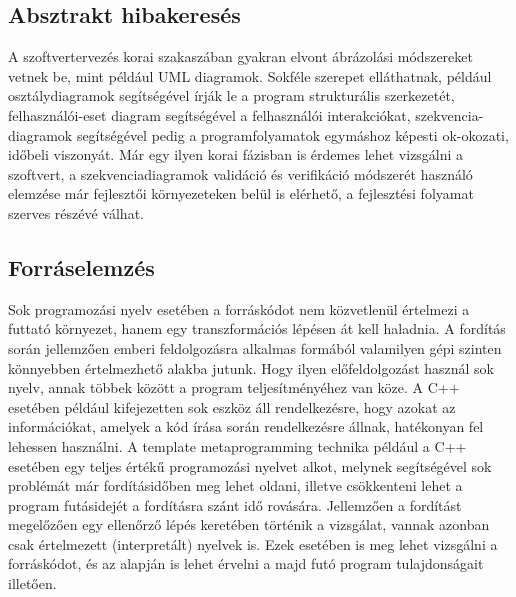 \documentclass[a4paper,12pt]{report}
\begin{document}
\subsection{Absztrakt hibakeresés}
A szoftvertervezés korai szakaszában gyakran elvont ábrázolási módszereket vetnek be, mint például UML diagramok. Sokféle szerepet elláthatnak, például osztálydiagramok segítségével írják le a program strukturális szerkezetét, felhasználói-eset diagram segítségével a felhasználói interakciókat, szekvencia-diagramok segítségével pedig a programfolyamatok egymáshoz képesti ok-okozati, időbeli viszonyát. Már egy ilyen korai fázisban is érdemes lehet vizsgálni a szoftvert, a szekvenciadiagramok validáció és verifikáció módszerét használó elemzése  \cite{umlverification} már fejlesztői környezeteken belül is elérhető, a fejlesztési folyamat szerves részévé válhat.

\subsection{Forráselemzés}
Sok programozási nyelv esetében a forráskódot nem közvetlenül értelmezi a futtató környezet, hanem egy transzformációs lépésen át kell haladnia. A fordítás során jellemzően emberi feldolgozásra alkalmas formából valamilyen gépi szinten könnyebben értelmezhető alakba jutunk. Hogy ilyen előfeldolgozást használ sok nyelv, annak többek között a program teljesítményéhez van köze. A C++ esetében például kifejezetten sok eszköz áll rendelkezésre, hogy azokat az információkat, amelyek a kód írása során rendelkezésre állnak, hatékonyan fel lehessen használni. A template metaprogramming technika például a C++ esetében egy teljes értékű programozási nyelvet alkot, melynek segítségével sok problémát már fordításidőben meg lehet oldani, illetve csökkenteni lehet a program futásidejét a fordításra szánt idő rovására.
Jellemzően a fordítást megelőzően egy ellenőrző lépés keretében történik a vizsgálat, vannak azonban csak értelmezett (interpretált) nyelvek is. Ezek esetében is meg lehet vizsgálni a forráskódot, és az alapján is lehet érvelni a majd futó program tulajdonságait illetően.
\end{document}
